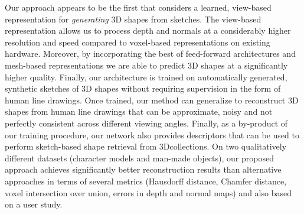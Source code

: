 \documentclass[10pt, conference, compsocconf]{IEEEtran}
\begin{document}
Our approach appears to be the first that considers a  learned, view-based representation for \emph{generating} 3D shapes from sketches. The view-based representation allows us to process depth and normals at a considerably higher resolution and speed compared to voxel-based representations on existing hardware. Moreover, by incorporating the best of feed-forward architectures and mesh-based representations we are able to predict 3D shapes at a significantly higher quality. Finally,  our architecture is trained on automatically generated, synthetic sketches of 3D shapes without requiring  supervision in the form of human line drawings.
Once trained, our method  can generalize to reconstruct 3D shapes from   human line drawings that can be approximate, noisy and not perfectly consistent across different viewing angles. Finally, as a by-product of our training procedure, our network also provides   descriptors that can be used to perform sketch-based shape retrieval from 3D\model collections.
On two qualitatively different datasets (character models and man-made objects), our proposed approach achieves significantly better reconstruction results than alternative approaches in terms of several metrics (Hausdorff distance, Chamfer distance, voxel intersection over union,  errors in depth and normal maps) and also based on a  user study.



\vspace{-2mm}
\end{document}

